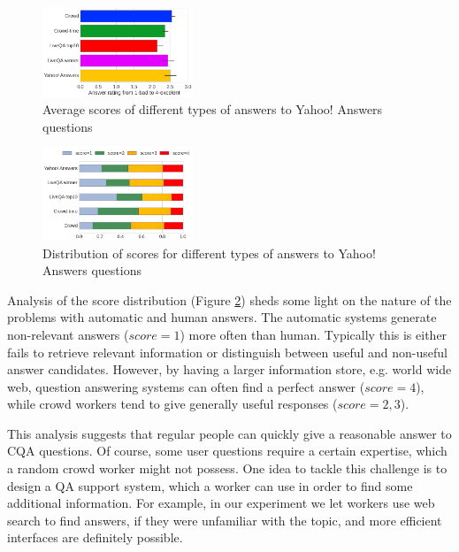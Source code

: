 \documentclass[11pt,letterpaper]{article}
\begin{document}
\begin{figure}[h]
	\centering
	\includegraphics[width=0.4\textwidth]{img/average_score}
	\caption{Average scores of different types of answers to Yahoo! Answers questions}
	\label{fig:average_score}
\end{figure}

\begin{figure}[h]
	\centering
	\includegraphics[width=0.4\textwidth]{img/scores_distribution}
	\caption{Distribution of scores for different types of answers to Yahoo! Answers questions}
	\label{fig:scores_distribution}
\end{figure}


Analysis of the score distribution (Figure \ref{fig:scores_distribution}) sheds some light on the nature of the problems with automatic and human answers. The automatic systems generate non-relevant answers ($score=1$) more often than human. Typically this is either fails to retrieve relevant information or distinguish between useful and non-useful answer candidates.
However, by having a larger information store, e.g. world wide web, question answering systems can often find a perfect answer ($score=4$), while crowd workers tend to give generally useful responses ($score=2,3$).

This analysis suggests that regular people can quickly give a reasonable answer to CQA questions.
Of course, some user questions require a certain expertise, which a random crowd worker might not possess.
One idea to tackle this challenge is to design a QA support system, which a worker can use in order to find some additional information.
For example, in our experiment we let workers use web search to find answers, if they were unfamiliar with the topic, and more efficient interfaces are definitely possible.
\end{document}
